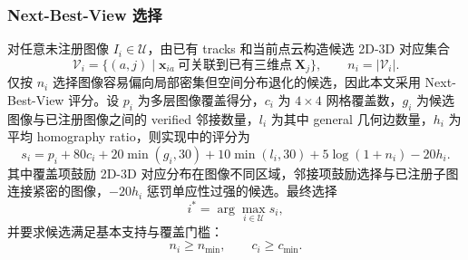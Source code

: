 \documentclass[lang=cn,a4paper,newtx]{elegantpaper} %
\begin{document}
\subsubsection{Next-Best-View 选择}
对任意未注册图像 $I_i\in\mathcal{U}$，由已有 tracks 和当前点云构造候选 2D-3D 对应集合
\begin{equation}
    \mathcal{V}_i
    =
    \{(a,j)\mid \mathbf{x}_{ia}\ \text{可关联到已有三维点}\ \mathbf{X}_j\},
    \qquad
    n_i=|\mathcal{V}_i|.
\end{equation}
仅按 $n_i$ 选择图像容易偏向局部密集但空间分布退化的候选，因此本文采用 Next-Best-View 评分。设 $p_i$ 为多层图像覆盖得分，$c_i$ 为 $4\times4$ 网格覆盖数，$g_i$ 为候选图像与已注册图像之间的 verified 邻接数量，$l_i$ 为其中 general 几何边数量，$h_i$ 为平均 homography ratio，则实现中的评分为
\begin{equation}
    s_i
    =
    p_i
    +80c_i
    +20\min(g_i,30)
    +10\min(l_i,30)
    +5\log(1+n_i)
    -20h_i .
\end{equation}
其中覆盖项鼓励 2D-3D 对应分布在图像不同区域，邻接项鼓励选择与已注册子图连接紧密的图像，$-20h_i$ 惩罚单应性过强的候选。最终选择
\begin{equation}
    i^{*}=\arg\max_{i\in\mathcal{U}}s_i,
\end{equation}
并要求候选满足基本支持与覆盖门槛：
\begin{equation}
    n_i\ge n_{\min},\qquad c_i\ge c_{\min}.
\end{equation}
\end{document}
